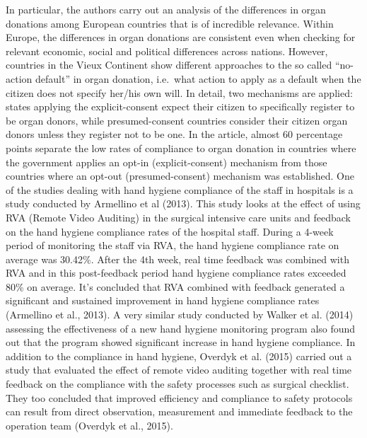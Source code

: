 \documentclass[]{article}
\begin{document}
In particular, the authors carry out an analysis of the differences in
organ donations among European countries that is of incredible
relevance. Within Europe, the differences in organ donations are
consistent even when checking for relevant economic, social and
political differences across nations. However, countries in the Vieux
Continent show different approaches to the so called ``no-action
default'' in organ donation, i.e.~what action to apply as a default when
the citizen does not specify her/his own will. In detail, two mechanisms
are applied: states applying the explicit-consent expect their citizen
to specifically register to be organ donors, while presumed-consent
countries consider their citizen organ donors unless they register not
to be one. In the article, almost 60 percentage points separate the low
rates of compliance to organ donation in countries where the government
applies an opt-in (explicit-consent) mechanism from those countries
where an opt-out (presumed-consent) mechanism was established. One of
the studies dealing with hand hygiene compliance of the staff in
hospitals is a study conducted by Armellino et al (2013). This study
looks at the effect of using RVA (Remote Video Auditing) in the surgical
intensive care units and feedback on the hand hygiene compliance rates
of the hospital staff. During a 4-week period of monitoring the staff
via RVA, the hand hygiene compliance rate on average was 30.42\%. After
the 4th week, real time feedback was combined with RVA and in this
post-feedback period hand hygiene compliance rates exceeded 80\% on
average. It's concluded that RVA combined with feedback generated a
significant and sustained improvement in hand hygiene compliance rates
(Armellino et al., 2013). A very similar study conducted by Walker et
al. (2014) assessing the effectiveness of a new hand hygiene monitoring
program also found out that the program showed significant increase in
hand hygiene compliance. In addition to the compliance in hand hygiene,
Overdyk et al. (2015) carried out a study that evaluated the effect of
remote video auditing together with real time feedback on the compliance
with the safety processes such as surgical checklist. They too concluded
that improved efficiency and compliance to safety protocols can result
from direct observation, measurement and immediate feedback to the
operation team (Overdyk et al., 2015).
\end{document}
